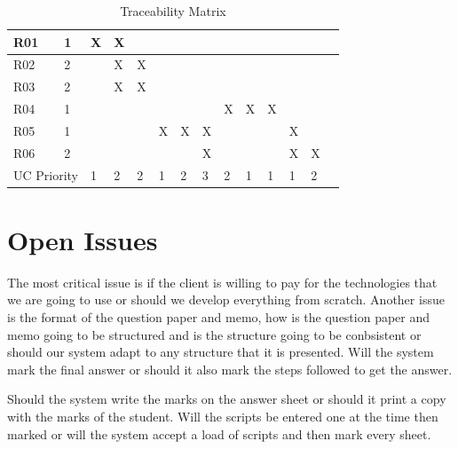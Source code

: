\documentclass{article}
\begin{document}
\begin{table}[h!]
\begin{tabular}{|l|l|l|l|l|l|l|l|l|l|l|l|l|l|}
R01 & 1 & X & X &   &   &   &   &   &   &   &   &    \\ \hline
R02 & 2 &   & X & X &   &   &   &   &   &   &   &    \\ \hline
R03 & 2 &   & X & X &   &   &   &   &   &   &   &    \\ \hline
R04 & 1 &   &   &   &   &   &   & X & X & X &   &    \\ \hline
R05 & 1 &   &   &   & X & X & X &   &   &   & X &    \\ \hline
R06 & 2 &   &   &   &   &   & X &   &   &   & X &  X  \\ \hline
\multicolumn{2}{|c|}{UC Priority} & 1 & 2 & 2 & 1 & 2 & 3 & 2 & 1 & 1 & 1 & 2   \\ \hline
\end{tabular}
\caption{Traceability Matrix}
\end{table}

\section{Open Issues}
	 The most critical issue is if the client is willing to pay for the technologies that we are going to use or should we develop everything from scratch. Another issue is the format of the question paper and memo, how is the question paper and memo going to be structured and is the structure going to be conbsistent or should our system adapt to any structure that it is presented. Will the system mark the final answer or should it also mark the steps followed to get the answer. \par
	 Should the system write the marks on the answer sheet or should it print a copy with the marks of the student. Will the scripts be entered one at the time then marked or will the system accept a load of scripts and then mark every sheet. 
\end{document}
